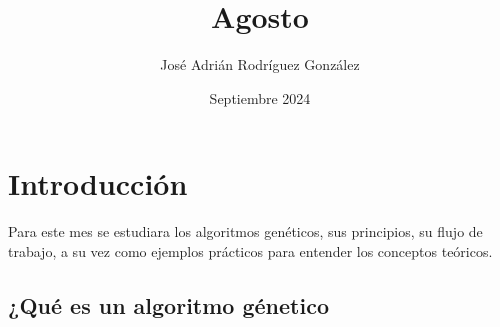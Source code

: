 \documentclass{article}
\title{Agosto}
\author{José Adrián Rodríguez González}
\date{Septiembre 2024}
\begin{document}
\maketitle
\section{Introducción}
Para este mes se estudiara los algoritmos genéticos, sus principios, su flujo de trabajo, a su vez como ejemplos prácticos para entender los conceptos teóricos.
\subsection{¿Qué es un algoritmo génetico}
\end{document}
